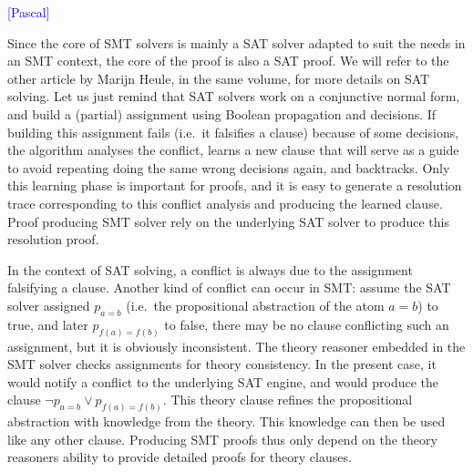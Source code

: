 \documentclass{llncs}
\newcommand{\Note}[1]{\textcolor{blue}{[#1]}}
\begin{document}
\Note{Pascal}

Since the core of SMT solvers is mainly a SAT solver adapted to suit the needs
in an SMT context, the core of the proof is also a SAT proof.  We will refer to
the other article by Marijn Heule, in the same volume, for more details on SAT
solving.  Let us just remind that SAT solvers work on a conjunctive normal form,
and build a (partial) assignment using Boolean propagation and decisions.  If
building this assignment fails (i.e.\ it falsifies a clause) because of some
decisions, the algorithm analyses the conflict, learns a new clause that will
serve as a guide to avoid repeating doing the same wrong decisions again, and
backtracks.  Only this learning phase is important for proofs, and it is easy to
generate a resolution trace corresponding to this conflict analysis and
producing the learned clause.  Proof producing SMT solver rely on the underlying
SAT solver to produce this resolution proof.

In the context of SAT solving, a conflict is always due to the assignment
falsifying a clause.  Another kind of conflict can occur in SMT: assume the SAT
solver assigned $p_{a=b}$ (i.e.\ the propositional abstraction of the atom
$a=b$) to true, and later $p_{f(a) = f(b)}$ to false, there may be no clause
conflicting such an assignment, but it is obviously inconsistent.  The theory
reasoner embedded in the SMT solver checks assignments for theory consistency.
In the present case, it would notify a conflict to the underlying SAT engine,
and would produce the clause $\neg p_{a=b} \vee p_{f(a) = f(b)}$.  This theory
clause refines the propositional abstraction with knowledge from the theory.
This knowledge can then be used like any other clause.  Producing SMT proofs
thus only depend on the theory reasoners ability to provide detailed proofs for
theory clauses.
\end{document}
